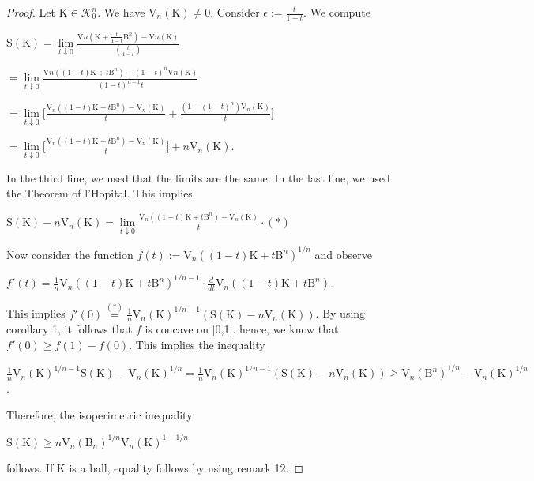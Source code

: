 \documentclass[a4paper]{book}
\numberwithin{theorem}{section}%
\begin{document}
\begin{proof}
    Let $\mathrm{K}\in\mathscr{K}_{0}^{n}$. We have $\mathrm{V}_{n}(\mathrm{K})\neq0$. Consider $\displaystyle \epsilon:=\frac{t}{1-t}$. We compute
    \begin{center}
        $\displaystyle \mathrm{S}(\mathrm{K})=\underset{t\downarrow0}{\lim}\frac{\mathrm{V}{n}(\mathrm{K}+\frac{t}{1-t}\mathrm{B}^{n})-\mathrm{V}{n}(\mathrm{K})}{(\frac{t}{1-t})}$

        $\displaystyle =\underset{t\downarrow0}{\lim}\frac{\mathrm{V}{n}((1-t)\mathrm{K}+t\mathrm{B}^{n})-(1-t)^{n}\mathrm{V}{n}(\mathrm{K})}{(1-t)^{n-1}t}$

        $\displaystyle =\underset{t\downarrow0}{\lim}\Big[\frac{\mathrm{V}_{n}((1-t)\mathrm{K}+t\mathrm{B}^{n})-\mathrm{V}_{n}(\mathrm{K})}{t}+\frac{(1-(1-t)^{n})\mathrm{V}_{n}(\mathrm{K})}{t}\Big]$

        $\displaystyle =\underset{t\downarrow0}{\lim}\Big[\frac{\mathrm{V}_{n}((1-t)\mathrm{K}+t\mathrm{B}^{n})-\mathrm{V}_{n}(\mathrm{K})}{t}\Big]+n\mathrm{V}_{n}(\mathrm{K})$.
    \end{center}
    In the third line, we used that the limits are the same. In the last line, we used the Theorem of l'Hopital. This implies
    \begin{center}
        $\displaystyle \mathrm{S}(\mathrm{K})-n\mathrm{V}_{n}(\mathrm{K})=\underset{t\downarrow0}{\lim}\frac{\mathrm{V}_{n}((1-t)\mathrm{K}+t\mathrm{B}^{n})-\mathrm{V}_{n}(\mathrm{K})}{t}\cdot(\ast)$
    \end{center}
    Now consider the function $f(t):=\mathrm{V}_{n}((1-t)\mathrm{K}+t\mathrm{B}^{n})^{1/n}$ and observe
    \begin{center}
        $f'(t)=\frac{1}{n}\mathrm{V}_{n}((1-t)\mathrm{K}+t\mathrm{B}^{n})^{1/{n-1}}\cdot\frac{d}{dt}\mathrm{V}_{n}((1-t)\mathrm{K}+t\mathrm{B}^{n})$.
    \end{center}
    This implies $f'(0)\overset{(\ast)}{=}\frac{1}{n}\mathrm{V}_{n}(\mathrm{K})^{1/{n-1}}(\mathrm{S}(\mathrm{K})-n\mathrm{V}_{n}(\mathrm{K}))$. By using corollary 1, it follows that $f$ is concave on [0,1]. hence, we know that $f'(0)\geq f(1)-f(0)$. This implies the inequality
    \begin{center}
        $\displaystyle \frac{1}{n}\mathrm{V}_{n}(\mathrm{K})^{1/{n-1}}\mathrm{S}(\mathrm{K})-\mathrm{V}_{n}(\mathrm{K})^{1/n}=\frac{1}{n}\mathrm{V}_{n}(\mathrm{K})^{1/{n-1}}(\mathrm{S}(\mathrm{K})-n\mathrm{V}_{n}(\mathrm{K}))\geq\mathrm{V}_{n}(\mathrm{B}^{n})^{1/n}-\mathrm{V}_{n}(\mathrm{K})^{1/n}$.
    \end{center}
    Therefore, the isoperimetric inequality
    \begin{center}
        $\displaystyle \mathrm{S}(\mathrm{K})\geq n\mathrm{V}_{n}(\mathrm{B}_{n})^{1/n}\mathrm{V}_{n}(\mathrm{K})^{1-1/n}$
    \end{center}
    follows. If $\mathrm{K}$ is a ball, equality follows by using remark 12.


\end{proof}
\end{document}
